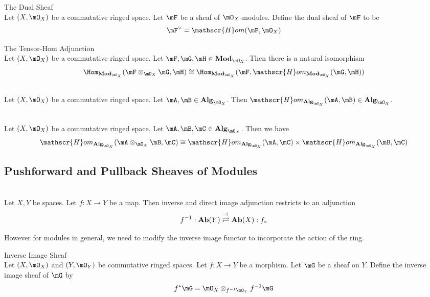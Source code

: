 \documentclass[a4paper]{article}
\begin{document}
\begin{defn}{The Dual Sheaf}{}\\
Let $(X,\mO_X)$ be a commutative ringed space. Let $\mF$ be a sheaf of $\mO_X$-modules. Define the dual sheaf of $\mF$ to be $$\mF^\vee=\mathscr{H}om(\mF,\mO_X)$$
\end{defn}

\begin{thm}{The Tensor-Hom Adjunction}{}\\
Let $(X,\mO_X)$ be a commutative ringed space. Let $\mF,\mG,\mH\in\bold{Mod}_{\mO_X}$. Then there is a natural isomorphism $$\Hom_{\bold{Mod}_{\mO_X}}(\mF\otimes_{\mO_X}\mG,\mH)\cong\Hom_{\bold{Mod}_{\mO_X}}(\mF,\mathscr{H}om_{\bold{Mod}_{\mO_X}}(\mG,\mH))$$
\end{thm}

\begin{prp}{}{}\\
Let $(X,\mO_X)$ be a commutative ringed space. Let $\mA,\mB\in\bold{Alg}_{\mO_X}$. Then $\mathscr{H}om_{\bold{Alg}_{\mO_X}}(\mA,\mB)\in\bold{Alg}_{\mO_X}$. 
\end{prp}

\begin{prp}{}{}\\
Let $(X,\mO_X)$ be a commutative ringed space. Let $\mA,\mB,\mC\in\bold{Alg}_{\mO_X}$. Then we have $$\mathscr{H}om_{\bold{Alg}_{\mO_X}}(\mA\otimes_{\mO_X}\mB,\mC)\cong\mathscr{H}om_{\bold{Alg}_{\mO_X}}(\mA,\mC)\times\mathscr{H}om_{\bold{Alg}_{\mO_X}}(\mB,\mC)$$
\end{prp}

\subsection{Pushforward and Pullback Sheaves of Modules}
\begin{lmm}{}{}\\
Let $X,Y$ be spaces. Let $f:X\to Y$ be a map. Then inverse and direct image adjunction restricts to an adjunction $$f^{-1}:\bold{Ab}(Y)\overset{\dashv}{\rightleftarrows}\bold{Ab}(X):f_\ast$$
\end{lmm}

However for modules in general, we need to modify the inverse image functor to incorporate the action of the ring. 

\begin{defn}{Inverse Image Sheaf}{}\\
Let $(X,\mO_X)$ and $(Y,\mO_Y)$ be commutative ringed spaces. Let $f:X\to Y$ be a morphism. Let $\mG$ be a sheaf on $Y$. Define the inverse image sheaf of $\mG$ by $$f^\ast\mG=\mO_X\otimes_{f^{-1}\mO_Y}f^{-1}\mG$$
\end{defn}
\end{document}
